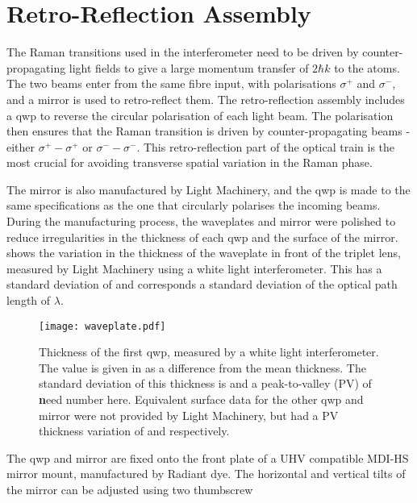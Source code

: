 \section{Retro-Reflection Assembly}\label{subsec:setup_ramanmirror} The
		Raman transitions used in the interferometer need to be driven by
		counter-propagating light fields to give a large momentum transfer of \(2
		\hbar k\) to the atoms. The two beams enter from the same fibre
    input, with polarisations $\sigma^+$ and $\sigma^-$, and a
		mirror is used to retro-reflect them. The retro-reflection assembly includes
		a \ac{qwp} to reverse the circular polarisation of each light
    beam. The polarisation then ensures that the Raman transition is
    driven by counter-propagating beams - either $\sigma^+ - \sigma^+$
    or $\sigma^- - \sigma^-$. This retro-reflection part of the
    optical train
    is the most crucial for avoiding transverse spatial variation in
    the Raman phase.\par\noindent
		The mirror is also manufactured by Light Machinery, and the \ac{qwp} is made
		to the same specifications as the one that circularly polarises the incoming
		beams.  During the manufacturing process, the waveplates and mirror were
		polished to reduce irregularities in the thickness of each \ac{qwp} and the
		surface of the mirror.  shows the variation in
		the thickness of the waveplate in front of the triplet lens, measured by
		Light Machinery using a white light interferometer. This has a standard
		deviation of  and corresponds a standard
		deviation of the optical path length of \(\lambda\).
\begin{figure}[!htbp] 
  \centering
  \texttt{[image: waveplate.pdf]}
  \caption[Quarter-wave plate thickness variation.]{Thickness of the first \ac{qwp}, measured by a white light
		interferometer. The value is given in \sivalue{}{\nano\metre} as a
		difference from the mean thickness. The standard deviation of this thickness
		is  and a peak-to-valley (PV) of {\textbf need
		number here}. Equivalent surface data for the other \ac{qwp} and mirror were
		not provided by Light Machinery, but had a PV thickness variation of
		 and
		 respectively.} \label{fig:waveplate_map}
\end{figure} 
The \ac{qwp} and mirror are fixed onto the front
plate of a UHV compatible MDI-HS mirror mount, manufactured by Radiant dye. The
horizontal and vertical tilts of the mirror can be adjusted using two thumbscrew
